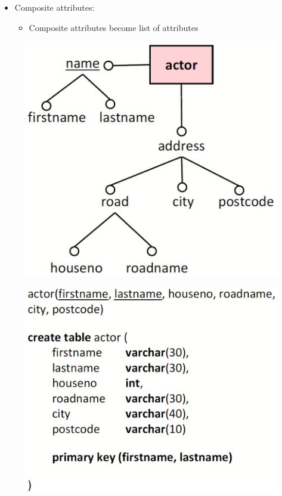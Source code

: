 \documentclass[conference]{IEEEtran}
\begin{document}
\begin{itemize}
    \item Composite attributes:
    \begin{itemize}
        \item Composite attributes become list of attributes
    \end{itemize}
\end{itemize}
\begin{figure} [h!]
    \centering
    \includegraphics[scale=0.5]{Ex20.JPG}
\end{figure}
\begin{figure} [h!]
    \centering
    \includegraphics[scale=0.5]{Ex21.JPG}
\end{figure}
\end{document}
